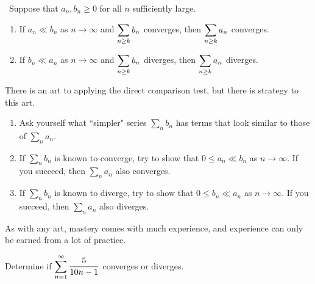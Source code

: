 

\begin{theorem}\,
Suppose that $a_n,b_n\ge 0$ for all $n$ sufficiently large.
\begin{enumerate}
\item If $a_n\ll b_n$ as $n\to\infty$ and $\displaystyle\sum_{n\ge k} b_n$ converges, then $\displaystyle\sum_{n\ge k}a_n$ converges.
\item If $b_n\ll a_n$ as $n\to\infty$ and $\displaystyle\sum_{n\ge k} b_n$ diverges, then $\displaystyle\sum_{n\ge k}a_n$ diverges.\label{direct comparison test}
\end{enumerate}
\end{theorem}
%

\begin{remark}
There is an art to applying the direct comparison test, but there is strategy to this art.
\begin{enumerate}
\item Ask yourself what ``simpler" series $\sum_n b_n$ has terms that look similar to those of $\sum_n a_n$.
\item If $\sum_n b_n$ is known to converge, try to show that $0\le a_n\ll b_n$ as $n\to\infty$.  If you succeed, then $\sum_n a_n$ also converges.
\item If $\sum_n b_n$ is known to diverge, try to show that $0\le b_n\ll a_n$ as $n\to\infty$. If you succeed, then $\sum_n a_n$ also diverges.
\end{enumerate}
As with any art, mastery comes with much experience, and experience can only be earned from a lot of practice.
\end{remark}

\newpage

\begin{example}
Determine if $\displaystyle\sum_{n=1}^\infty\frac{5}{10n-1}$ converges or diverges.
\end{example}
\ifdefined\SOLUTION
{}
\else
\fi

